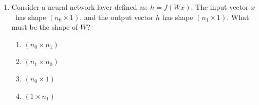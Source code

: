 \documentclass[12pt]{article}
\begin{document}
\begin{enumerate}[label=Q\arabic*.]
\begin{enumerate}[label=(\Alph*)]
    \item Both the input at time $t$ and the hidden state at time $t-1$
    \item All future inputs
\end{enumerate}
\item Consider a neural network layer defined as: $h = f(Wx)$. The input vector $x$\ has shape $(n_0 \times 1)$, and the output vector $h$ has shape $(n_1 \times 1)$. What must be the shape of $W$?
\begin{enumerate}[label=(\Alph*)]
    \item $(n_0 \times n_1)$
    \item $(n_1 \times n_0)$
    \item $(n_0 \times 1)$
    \item $(1 \times n_1)$
\end{enumerate}

\end{enumerate}
\end{document}
